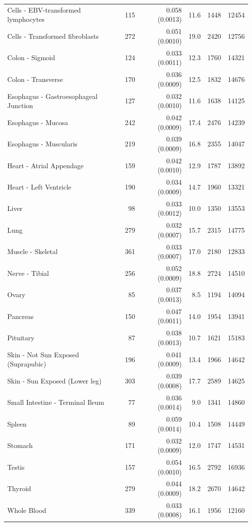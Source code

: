 \documentclass[10pt,letterpaper]{article}
\begin{document}
\begin{table}[!ht]
\begin{adjustwidth}{-2.25in}{0in}
\begin{tabular}{lrrrrr}
  Cells - EBV-transformed lymphocytes & 115 & 0.058 (0.0013) & 11.6 & 1448 & 12454 \\ 
  Cells - Transformed fibroblasts & 272 & 0.051 (0.0010) & 19.0 & 2420 & 12756 \\ 
  Colon - Sigmoid & 124 & 0.033 (0.0011) & 12.3 & 1760 & 14321 \\ 
  Colon - Transverse & 170 & 0.036 (0.0009) & 12.5 & 1832 & 14676 \\ 
  Esophagus - Gastroesophageal Junction & 127 & 0.032 (0.0010) & 11.6 & 1638 & 14125 \\ 
  Esophagus - Mucosa & 242 & 0.042 (0.0009) & 17.4 & 2476 & 14239 \\ 
  Esophagus - Muscularis & 219 & 0.039 (0.0009) & 16.8 & 2355 & 14047 \\ 
  Heart - Atrial Appendage & 159 & 0.042 (0.0010) & 12.9 & 1787 & 13892 \\ 
  Heart - Left Ventricle & 190 & 0.034 (0.0009) & 14.7 & 1960 & 13321 \\ 
  Liver & 98 & 0.033 (0.0012) & 10.0 & 1350 & 13553 \\ 
  Lung & 279 & 0.032 (0.0007) & 15.7 & 2315 & 14775 \\ 
  Muscle - Skeletal & 361 & 0.033 (0.0007) & 17.0 & 2180 & 12833 \\ 
  Nerve - Tibial & 256 & 0.052 (0.0009) & 18.8 & 2724 & 14510 \\ 
  Ovary & 85 & 0.037 (0.0013) & 8.5 & 1194 & 14094 \\ 
  Pancreas & 150 & 0.047 (0.0011) & 14.0 & 1954 & 13941 \\ 
  Pituitary & 87 & 0.038 (0.0013) & 10.7 & 1621 & 15183 \\ 
  Skin - Not Sun Exposed (Suprapubic) & 196 & 0.041 (0.0009) & 13.4 & 1966 & 14642 \\ 
  Skin - Sun Exposed (Lower leg) & 303 & 0.039 (0.0008) & 17.7 & 2589 & 14625 \\ 
  Small Intestine - Terminal Ileum & 77 & 0.036 (0.0014) & 9.0 & 1341 & 14860 \\ 
  Spleen & 89 & 0.059 (0.0014) & 10.4 & 1508 & 14449 \\ 
  Stomach & 171 & 0.032 (0.0009) & 12.0 & 1747 & 14531 \\ 
  Testis & 157 & 0.054 (0.0010) & 16.5 & 2792 & 16936 \\ 
  Thyroid & 279 & 0.044 (0.0009) & 18.2 & 2670 & 14642 \\ 
  Whole Blood & 339 & 0.033 (0.0008) & 16.1 & 1956 & 12160 \\ 

\end{tabular}
\end{adjustwidth}
\end{table}
\end{document}
